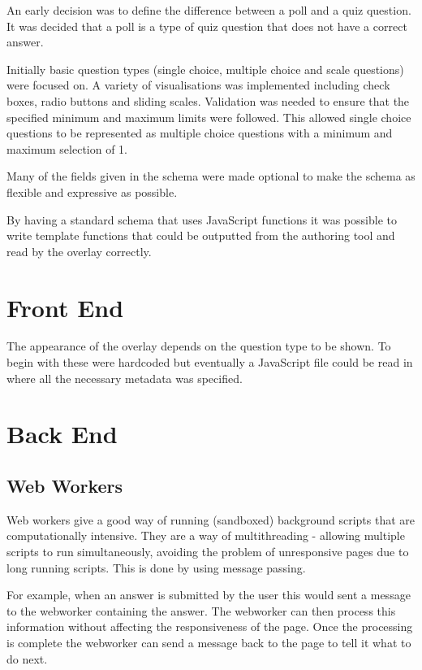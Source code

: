 An early decision was to define the difference between a poll and a quiz question. It was decided that a poll is a type of quiz question that does not have a correct answer.

Initially basic question types (single choice, multiple choice and scale questions) were focused on. A variety of visualisations was implemented including check boxes, radio buttons and sliding scales. Validation was needed to ensure that the specified minimum and maximum limits were followed. This allowed single choice questions to be represented as multiple choice questions with a minimum and maximum selection of 1.

Many of the fields given in the schema were made optional to make the schema as flexible and expressive as possible. 

By having a standard schema that uses JavaScript functions it was possible to write template functions that could be outputted from the authoring tool and read by the overlay correctly.
\section{Front End} 
\label{Section:Front end}
The appearance of the overlay depends on the question type to be shown. To begin with these were hardcoded but eventually a JavaScript file could be read in where all the necessary metadata was specified.
\section{Back End} 
\label{Section:Back end}
\subsection{Web Workers}
\label{Subsection:WebWorkers}
Web workers give a good way of running (sandboxed) background scripts that are computationally intensive. They are a way of multithreading - allowing multiple scripts to run simultaneously, avoiding the problem of unresponsive pages due to long running scripts. This is done by using message passing. 

For example, when an answer is submitted by the user this would sent a message to the webworker containing the answer. The webworker can then process this information without affecting the responsiveness of the page. Once the processing is complete the webworker can send a message back to the page to tell it what to do next.

